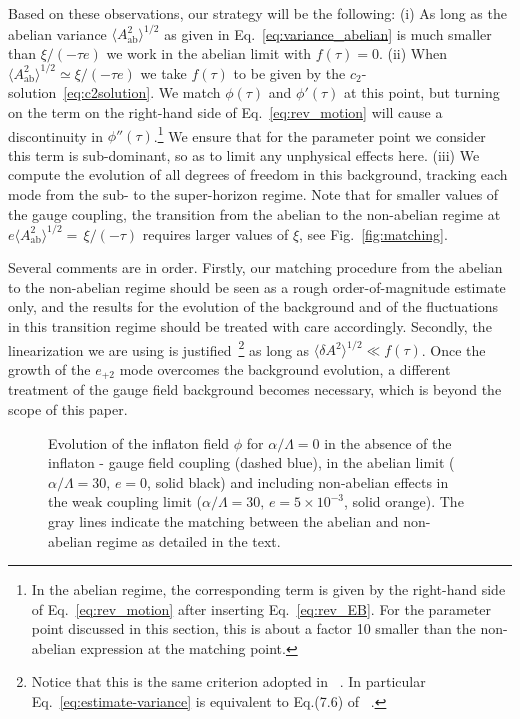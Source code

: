 Based on these observations, our strategy will be the following: (i) As long as the abelian variance $\langle A_\text{ab}^2 \rangle^{1/2}$ as given in Eq.~\eqref{eq:variance_abelian} is much smaller than $\xi /(- \tau e)$ we work in the abelian limit with $f(\tau) = 0$. (ii) When $\langle A_\text{ab}^2 \rangle^{1/2} \simeq \xi /(- \tau e)$ we take $f(\tau)$ to be given by the $c_2$-solution~\eqref{eq:c2solution}. We match $\phi(\tau)$ and $\phi'(\tau)$ at this point, but turning on the term on the right-hand side of Eq.~\eqref{eq:rev_motion} will cause a discontinuity in $\phi''(\tau)$.\footnote{In the abelian regime, the corresponding term is given by the right-hand side of Eq.~\eqref{eq:rev_motion} after inserting Eq.~\eqref{eq:rev_EB}. For the parameter point discussed in this section, this is about a factor 10 smaller than the non-abelian expression at the matching point.} We ensure that for the parameter point we consider this term is sub-dominant, so as to limit any unphysical effects here. (iii) We compute the evolution of all degrees of freedom in this background, tracking each mode from the sub- to the super-horizon regime. Note that for smaller values of the gauge coupling, the transition from the abelian to the non-abelian regime at $ e \langle A_\text{ab}^2 \rangle^{1/2} = \, \xi/(- \tau)$ requires larger values of $\xi$, see Fig.~\ref{fig:matching}.

Several comments are in order. Firstly, our matching procedure from the abelian to the non-abelian regime should be seen as a rough order-of-magnitude estimate only, and the results for the evolution of the background and of the fluctuations in this transition regime should be treated with care accordingly. Secondly, the linearization we are using is justified~\footnote{Notice that this is the same criterion adopted in~\cite{Adshead:2016omu} . In particular Eq.~\eqref{eq:estimate-variance} is equivalent to Eq.(7.6) of~\cite{Adshead:2016omu} .} as long as $\langle \delta A^2 \rangle^{1/2} \ll f(\tau)$. Once the growth of the $e_{+2}$ mode overcomes the background evolution, a different treatment of the gauge field background becomes necessary, which is beyond the scope of this paper.

\begin{figure}[t]
 \centering
 \hfill 
 \caption{Evolution of the inflaton field $\phi$ for $\alpha/\Lambda = 0$ in the absence of the inflaton - gauge field coupling (dashed blue), in the abelian limit ($\alpha/\Lambda = 30, \, e = 0$, solid black) and including non-abelian effects in the weak coupling limit ($\alpha/\Lambda = 30, \, e = 5 \times 10^{-3}$, solid orange). The gray lines indicate the matching between the abelian and non-abelian regime as detailed in the text.}
 \label{fig:phi-evolution}
\end{figure}


